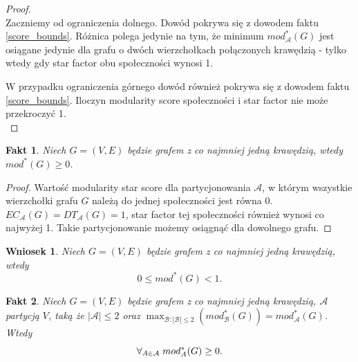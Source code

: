 \documentclass[letterpaper,12pt]{article}
\newtheorem{fact}{Fakt}
\newtheorem{conclusion}{Wniosek}
\begin{document}
\begin{proof}
  \leavevmode\\
  \indent Zaczniemy od ograniczenia dolnego. Dowód pokrywa się z dowodem faktu \ref{score_bounds}. Różnica polega jedynie na tym, że minimum \(mod_{\mathcal{A}}^*(G)\) jest osiągane jedynie dla grafu o dwóch wierzchołkach połączonych krawędzią - tylko wtedy gdy star factor obu społeczności wynosi 1.

  W przypadku ograniczenia górnego dowód również pokrywa się z dowodem faktu \ref{score_bounds}. Iloczyn modularity score społeczności i star factor nie może przekroczyć 1.\\
\end{proof}

\begin{fact}
  Niech \(G = (V,E)\) będzie grafem z co najmniej jedną krawędzią, wtedy \(mod^*(G) \geq 0\).
\end{fact}

\begin{proof}
  Wartość modularity star score dla partycjonowania \(\mathcal{A}\), w którym wszystkie wierzchołki grafu \(G\) należą do jednej społeczności jest równa 0. \(EC_{\mathcal{A}}(G) = DT_{\mathcal{A}}(G) = 1\), star factor tej społeczności również wynosi co najwyżej 1. Takie partycjonowanie możemy osiągnąć dla dowolnego grafu.
\end{proof}

\begin{conclusion}
  Niech \(G = (V,E)\) będzie grafem z co najmniej jedną krawędzią, wtedy
  \[0 \leq mod^*(G) < 1.\]
\end{conclusion}

\begin{fact}
  Niech \(G=(V,E)\) będzie grafem z co najmniej jedną krawędzią, \(\mathcal{A}\) partycją \(V\), taką że \(|\mathcal{A}|\leq 2\)  oraz \(\displaystyle \max_{\mathcal{B}: |\mathcal{B}| \leq 2} (mod_{\mathcal{B}}^*(G)) = mod_{\mathcal{A}}^*(G)\). Wtedy
  \[\forall_{A \in \mathcal{A}} \hspace{1mm} mod_A^*(G) \geq 0 .\]
\end{fact}
\end{document}
